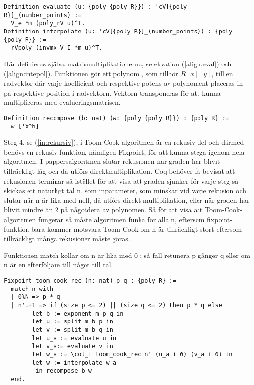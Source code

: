 \begin{lstlisting}
Definition evaluate (u: {poly {poly R}}) : 'cV[{poly R}]_(number_points) :=
  V_e *m (poly_rV u)^T.
Definition interpolate (u: 'cV[{poly R}]_(number_points)) : {poly {poly R}} :=
  rVpoly (invmx V_I *m u)^T.
\end{lstlisting}

Här definieras själva matrismultiplikationerna, se ekvation (\ref{align:eval})
och (\ref{align:intepol}). Funktionen  gör ett polynom , som
tillhör $R[x][y]$, till en radvektor där varje koefficient och respektive
potens av polynoment placeras in på respektive position i radvektorn. Vektorn
transponeras för att kunna multipliceras med evalueringsmatrisen.

\begin{lstlisting}
Definition recompose (b: nat) (w: {poly {poly R}}) : {poly R} :=
  w.['X^b].
\end{lstlisting}

Steg 4, se (\ref{in:rekursiv}), i Toom-Cook-algoritmen är en rekusiv del och
därmed behövs en rekusiv funktion, nämligen Fixpoint, för att kunna stega
igenom hela algoritmen. I pappersalgoritmen slutar rekusionen när graden har
blivit tillräckligt låg och då utförs direktmultiplikation. Coq behöver få
bevisat att rekusionen terminar så istället för att visa att graden sjunker för
varje steg så skickas ett naturligt tal n, som inparameter, som minskar vid
varje rekusion och slutar när n är lika med noll, då utförs direkt
multiplikation, eller när graden har blivit mindre än 2 på någotdera av
polynomen. Så för att visa att Toom-Cook-algoritmen fungerar så måste
algoritmen funka för alla n, eftersom fixpoint-funktion bara kommer motsvara
Toom-Cook om n är tillräckligt stort eftersom tillräckligt många rekusioner
måste göras.

Funktionen match kollar om n är lika med 0 i så fall retunera p gånger q eller
om n är en efterföljare till något till tal.

\begin{lstlisting}
Fixpoint toom_cook_rec (n: nat) p q : {poly R} :=
  match n with
  | 0%N => p * q
  | n'.+1 => if (size p <= 2) || (size q <= 2) then p * q else
        let b := exponent m p q in
        let u := split m b p in
        let v := split m b q in
        let u_a := evaluate u in
        let v_a:= evaluate v in
        let w_a := \col_i toom_cook_rec n' (u_a i 0) (v_a i 0) in
        let w := interpolate w_a
         in recompose b w
  end.
\end{lstlisting}

